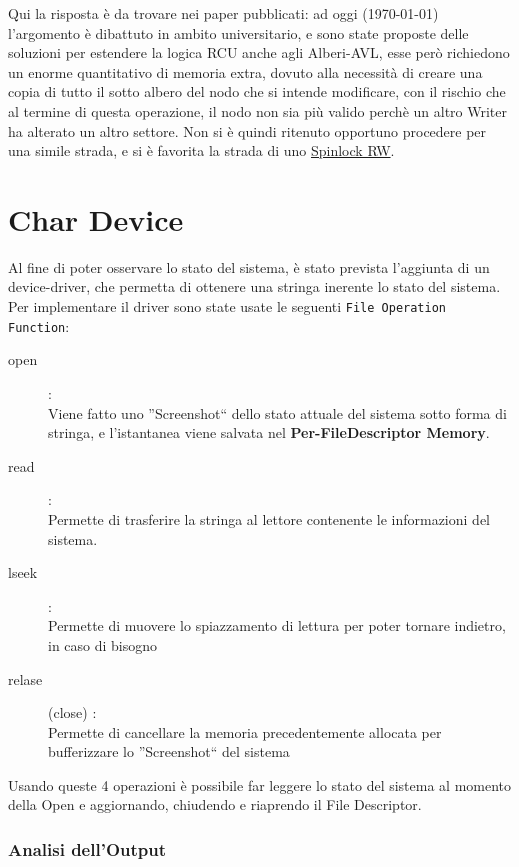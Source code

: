 Qui la risposta è da trovare nei paper pubblicati: ad oggi (\today) l'argomento è dibattuto in ambito universitario, e
sono state proposte delle soluzioni per estendere la logica RCU anche agli Alberi-AVL, esse però richiedono un enorme
quantitativo di memoria extra, dovuto alla necessità di creare una copia di tutto il sotto albero del nodo che si
intende modificare, con il rischio che al termine di questa operazione, il nodo non sia più valido perchè un altro
Writer ha alterato un altro settore. Non si è quindi ritenuto opportuno procedere per una simile strada, e si è
favorita la strada di uno \underline{Spinlock RW}.

\newpage

\section{Char Device} \label{CharDevice}

Al fine di poter osservare lo stato del sistema, è stato prevista l'aggiunta di un device-driver, che permetta di
ottenere una stringa inerente lo stato del sistema.
Per implementare il driver sono state usate le seguenti \texttt{File Operation Function}:

\begin{description}
 \item [open] :\\
Viene fatto uno ''Screenshot`` dello stato attuale del sistema sotto forma di stringa, e l'istantanea viene salvata
nel \textbf{Per-FileDescriptor Memory}.
 \item [read] :\\
 Permette di trasferire la stringa al lettore contenente le informazioni del sistema.
 \item [lseek] :\\
 Permette di muovere lo spiazzamento di lettura per poter tornare indietro, in caso di bisogno
 \item [relase] (close) :\\
 Permette di cancellare la memoria precedentemente allocata per bufferizzare lo ''Screenshot`` del sistema
\end{description}


Usando queste 4 operazioni è possibile far leggere lo stato del sistema al momento della Open e aggiornando, chiudendo
e riaprendo il File Descriptor.

\subsubsection{Analisi dell'Output} \label{OutputAnalisi}

